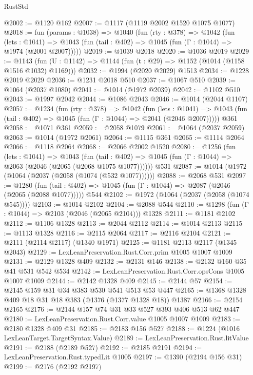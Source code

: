 \begin{lexlean}{RustStd}
\begin{coremodule}
@2002 := @1120 @162
@2007 := @1117 (@1119 @2002 @1520 @1075 @1077)
@2018 := fun (params : @1038) =>
  @1040
    (fun (rty : @378) =>
    @1042
      (fun (lets : @1041) =>
      @1043 (fun (tail : @402) => @1045 (fun (Γ : @1044) => @1974 (@2001 @2007)))))
@2019 := @1039 @2018
@2020 := @1036 @2019
@2029 := @1143 (fun (U : @1142) => @1144 (fun (t : @29) => @1152 (@1014 (@1158 @1516 @1032) @1169)))
@2032 := @1994 (@2020 @2029) @1513
@2034 := @1228 @2019 @2029
@2036 := @1231 @2018 @510
@2037 := @1067 @510
@2039 := @1064 (@2037 @1080)
@2041 := @1014 (@1972 @2039)
@2042 := @1102 @510
@2043 := @1997 @2042
@2044 := @1086 @2043
@2046 := @1014 (@2044 @1107)
@2057 := @1234
    (fun (rty : @378) =>
    @1042
      (fun (lets : @1041) =>
      @1043 (fun (tail : @402) => @1045 (fun (Γ : @1044) => @2041 (@2046 @2007)))))
    @361
@2058 := @1071 @361
@2059 := @2058 @1079
@2061 := @1064 (@2037 @2059)
@2063 := @1014 (@1972 @2061)
@2064 := @1115 @361
@2065 := @1114 @2064
@2066 := @1118 @2064
@2068 := @2066 @2002 @1520
@2080 := @1256
    (fun (lets : @1041) =>
    @1043
      (fun (tail : @402) => @1045 (fun (Γ : @1044) => @2063 (@2046 (@2065 (@2068 @1075 @1077))))))
    @531
@2087 := @1014 (@1972 (@1064 (@2037 (@2058 (@1074 (@532 @1077))))))
@2088 := @2068 @531
@2097 := @1280
    (fun (tail : @402) => @1045 (fun (Γ : @1044) => @2087 (@2046 (@2065 (@2088 @1077)))))
    @544
@2102 := @1972 (@1064 (@2037 (@2058 (@1074 @545))))
@2103 := @1014 @2102
@2104 := @2088 @544
@2110 := @1298 (fun (Γ : @1044) => @2103 (@2046 (@2065 @2104))) @1328
@2111 := @1181 @2102
@2112 := @1106 @1328
@2113 := @2044 @2112
@2114 := @1014 @2113
@2115 := @1113 @1328
@2116 := @2115 @2064
@2117 := @2116 @2104
@2121 := @2111 (@2114 @2117) (@1340 @1971)
@2125 := @1181 @2113 @2117 (@1345 @2043)
@2129 := LexLeanPreservation.Rust.Corr.prim @1005 @1007 @1009
@2131 := @2129 @1328 @409
@2132 := @2131 @146
@2138 := @2132 @160 @35 @41 @531 @542 @534
@2142 := LexLeanPreservation.Rust.Corr.opsCons @1005 @1007 @1009
@2144 := @2142 @1328 @409
@2145 := @2144 @57
@2154 := @2145 @159 @31 @34 @383 @530 @541 @513 @53 @447
@2165 := @1368 @1328 @409 @18 @31 @18 @383 (@1376 (@1377 @1328 @18)) @1387
@2166 := @2154 @2165
@2176 := @2144 @157 @74 @31 @33 @527 @393 @406 @513 @62 @447
@2180 := LexLeanPreservation.Rust.Corr.value @1005 @1007 @1009
@2183 := @2180 @1328 @409 @31
@2185 := @2183 @156 @527
@2188 := @1224 (@1016 LexLeanTarget.TargetSyntax.Value)
@2189 := LexLeanPreservation.Rust.litValue
@2191 := @2188 (@2189 @527)
@2192 := @2185 @2191
@2194 := LexLeanPreservation.Rust.typedLit @1005
@2197 := @1390 (@2194 @156 @31)
@2199 := @2176 (@2192 @2197)

\end{coremodule}
\end{lexlean}
